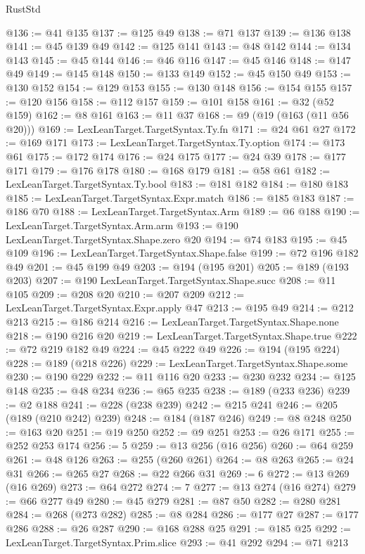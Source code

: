 \begin{lexlean}{RustStd}
\begin{coremodule}
{\begin{coremodule}
{{{{{{{{{{{{{{{@136 := @41 @135
@137 := @125 @49
@138 := @71 @137
@139 := @136 @138
@141 := @45 @139 @49
@142 := @125 @141
@143 := @48 @142
@144 := @134 @143
@145 := @45 @144
@146 := @46 @116
@147 := @45 @146
@148 := @147 @49
@149 := @145 @148
@150 := @133 @149
@152 := @45 @150 @49
@153 := @130 @152
@154 := @129 @153
@155 := @130 @148
@156 := @154 @155
@157 := @120 @156
@158 := @112 @157
@159 := @101 @158
@161 := @32 (@52 @159)
@162 := @8 @161
@163 := @11 @37
@168 := @9 (@19 (@163 (@11 @56 @20)))
@169 := LexLeanTarget.TargetSyntax.Ty.fn
@171 := @24 @61 @27
@172 := @169 @171
@173 := LexLeanTarget.TargetSyntax.Ty.option
@174 := @173 @61
@175 := @172 @174
@176 := @24 @175
@177 := @24 @39
@178 := @177 @171
@179 := @176 @178
@180 := @168 @179
@181 := @58 @61
@182 := LexLeanTarget.TargetSyntax.Ty.bool
@183 := @181 @182
@184 := @180 @183
@185 := LexLeanTarget.TargetSyntax.Expr.match
@186 := @185 @183
@187 := @186 @70
@188 := LexLeanTarget.TargetSyntax.Arm
@189 := @6 @188
@190 := LexLeanTarget.TargetSyntax.Arm.arm
@193 := @190 LexLeanTarget.TargetSyntax.Shape.zero @20
@194 := @74 @183
@195 := @45 @109
@196 := LexLeanTarget.TargetSyntax.Shape.false
@199 := @72 @196 @182 @49
@201 := @45 @199 @49
@203 := @194 (@195 @201)
@205 := @189 (@193 @203)
@207 := @190 LexLeanTarget.TargetSyntax.Shape.succ
@208 := @11 @105
@209 := @208 @20
@210 := @207 @209
@212 := LexLeanTarget.TargetSyntax.Expr.apply @47
@213 := @195 @49
@214 := @212 @213
@215 := @186 @214
@216 := LexLeanTarget.TargetSyntax.Shape.none
@218 := @190 @216 @20
@219 := LexLeanTarget.TargetSyntax.Shape.true
@222 := @72 @219 @182 @49
@224 := @45 @222 @49
@226 := @194 (@195 @224)
@228 := @189 (@218 @226)
@229 := LexLeanTarget.TargetSyntax.Shape.some
@230 := @190 @229
@232 := @11 @116 @20
@233 := @230 @232
@234 := @125 @148
@235 := @48 @234
@236 := @65 @235
@238 := @189 (@233 @236)
@239 := @2 @188
@241 := @228 (@238 @239)
@242 := @215 @241
@246 := @205 (@189 (@210 @242) @239)
@248 := @184 (@187 @246)
@249 := @8 @248
@250 := @163 @20
@251 := @19 @250
@252 := @9 @251
@253 := @26 @171
@255 := @252 @253 @174
@256 := 5
@259 := @13 @256 (@16 @256)
@260 := @64 @259
@261 := @48 @126
@263 := @255 (@260 @261)
@264 := @8 @263
@265 := @24 @31
@266 := @265 @27
@268 := @22 @266 @31
@269 := 6
@272 := @13 @269 (@16 @269)
@273 := @64 @272
@274 := 7
@277 := @13 @274 (@16 @274)
@279 := @66 @277 @49
@280 := @45 @279
@281 := @87 @50
@282 := @280 @281
@284 := @268 (@273 @282)
@285 := @8 @284
@286 := @177 @27
@287 := @177 @286
@288 := @26 @287
@290 := @168 @288 @25
@291 := @185 @25
@292 := LexLeanTarget.TargetSyntax.Prim.slice
@293 := @41 @292
@294 := @71 @213
}}}}}}}}}}}}}}}
\end{coremodule}}
\end{coremodule}
\end{lexlean}
